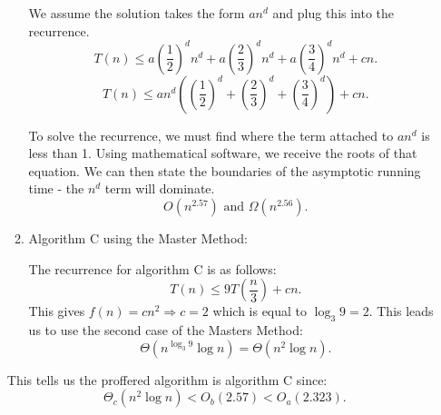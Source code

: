 \documentclass[letterpaper,11pt]{article}
\begin{document}
\begin{enumerate}
\begin{enumerate}
        We assume the solution takes the form $an^{d}$ and plug this into the
        recurrence.
        \[
            T\left( n \right) \le a\left( \frac{1}{2} \right) ^{d} n^{d}
            + a\left( \frac{2}{3} \right) ^{d}n^{d} 
            + a\left( \frac{3}{4} \right) ^{d}n^{d} + cn
        .\] 
        \[
            T\left( n \right) \le  an^{d}\left( \left( \frac{1}{2} \right) ^{d}
            + \left( \frac{2}{3} \right) ^{d} 
            + \left( \frac{3}{4} \right)^{d} \right) + cn
        .\] 

        To solve the recurrence, we must find where the term attached to $an^{d}$
        is less than 1. Using mathematical software, we receive the roots of
        that equation. We can then state the boundaries of the asymptotic 
        running time - the $n^{d}$ term will dominate. 
        \[
            O\left( n^{2.57} \right) \text{ and } \Omega \left( n^{2.56} \right) 
        .\] 

    \item Algorithm C using the Master Method:

        The recurrence for algorithm C is as follows:
        \[
            T\left( n \right) \le  9T\left( \frac{n}{3} \right) + cn
        .\] 
        This gives $f\left( n \right) = cn^{2} \Rightarrow c = 2$ which is 
        equal to $\log_{3}{9} = 2$. This leads us to use the second case of 
        the Masters Method:
        \[
            \Theta\left( n^{\log_{3}{9}} \log{n} \right) = \Theta \left( n^{2}\log{n} \right) 
        .\] 

\end{enumerate}

\color{teal}
This tells us the proffered algorithm is algorithm C since:
 \[
     \Theta_{c}\left( n^{2}\log{n} \right) < O_{b}\left( 2.57 \right) < O_{a}\left( 2.323 \right) 
.\] 

\end{enumerate}
\end{document}
